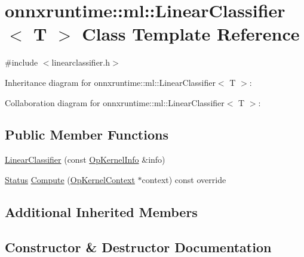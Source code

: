\hypertarget{classonnxruntime_1_1ml_1_1LinearClassifier}{}\section{onnxruntime\+:\+:ml\+:\+:Linear\+Classifier$<$ T $>$ Class Template Reference}
\label{classonnxruntime_1_1ml_1_1LinearClassifier}


{\ttfamily \#include $<$linearclassifier.\+h$>$}



Inheritance diagram for onnxruntime\+:\+:ml\+:\+:Linear\+Classifier$<$ T $>$\+:


Collaboration diagram for onnxruntime\+:\+:ml\+:\+:Linear\+Classifier$<$ T $>$\+:
\subsection*{Public Member Functions}
\begin{DoxyCompactItemize}
\item 
\mbox{\hyperlink{classonnxruntime_1_1ml_1_1LinearClassifier_a059d904a057bd7b7eecb9cbc74d231f6}{Linear\+Classifier}} (const \mbox{\hyperlink{classonnxruntime_1_1OpKernelInfo}{Op\+Kernel\+Info}} \&info)
\item 
\mbox{\hyperlink{classonnxruntime_1_1common_1_1Status}{Status}} \mbox{\hyperlink{classonnxruntime_1_1ml_1_1LinearClassifier_affe85ddee6d2dd79c389e77348bf2d94}{Compute}} (\mbox{\hyperlink{classonnxruntime_1_1OpKernelContext}{Op\+Kernel\+Context}} $\ast$context) const override
\end{DoxyCompactItemize}
\subsection*{Additional Inherited Members}


\subsection{Constructor \& Destructor Documentation}
\mbox{\label{classonnxruntime_1_1ml_1_1LinearClassifier_a059d904a057bd7b7eecb9cbc74d231f6}} 
